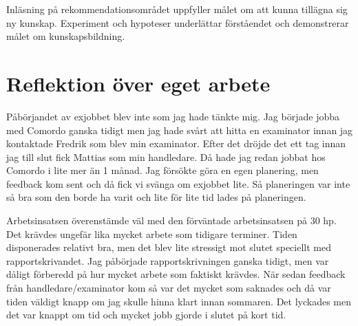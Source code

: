 \documentclass[11pt]{article}
\begin{document}
Inläsning på rekommendationsområdet uppfyller målet om att kunna tillägna sig ny kunskap. Experiment och hypoteser underlättar förståendet och demonstrerar målet om kunskapsbildning.

\section*{Reflektion över eget arbete}





Påbörjandet av exjobbet blev inte som jag hade tänkte mig. Jag började jobba med Comordo ganska tidigt men jag hade svårt att hitta en examinator innan jag kontaktade Fredrik som blev min examinator. Efter det dröjde det ett tag innan jag till slut fick Mattias som min handledare. Då hade jag redan jobbat hos Comordo i lite mer än 1 månad. Jag försökte göra en egen planering, men feedback kom sent och då fick vi svänga om exjobbet lite. Så planeringen var inte så bra som den borde ha varit och lite för lite tid lades på planeringen.

Arbetsinsatsen överenstämde väl med den förväntade arbetsinsatsen på 30 hp. Det krävdes ungefär lika mycket arbete som tidigare terminer. Tiden disponerades relativt bra, men det blev lite stressigt mot slutet speciellt med rapportskrivandet. Jag påbörjade rapportskrivningen ganska tidigt, men var dåligt förberedd på hur mycket arbete som faktiskt krävdes. När sedan feedback från handledare/examinator kom så var det mycket som saknades och då var tiden väldigt knapp om jag skulle hinna klart innan sommaren. Det lyckades men det var knappt om tid och mycket jobb gjorde i slutet på kort tid.
\end{document}
